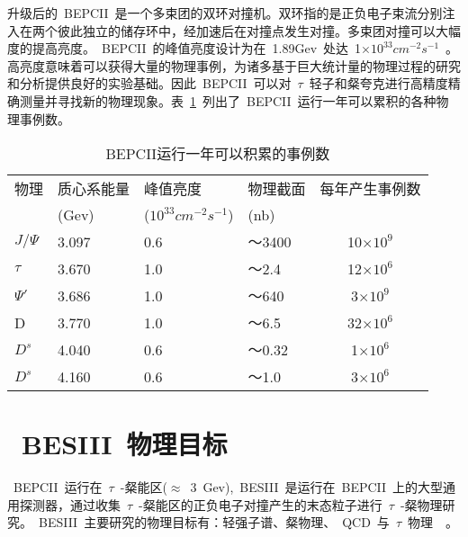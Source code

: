 升级后的~BEPCII~是一个多束团的双环对撞机。双环指的是正负电子束流分别注入在两个彼此独立的储存环中，经加速后在对撞点发生对撞。多束团对撞可以大幅度的提高亮度。~BEPCII~的峰值亮度设计为在~1.89Gev~处达~1$\times$$10^{33}$$cm^{-2}$$s^{-1}$~。高亮度意味着可以获得大量的物理事例，为诸多基于巨大统计量的物理过程的研究和分析提供良好的实验基础。因此~BEPCII~可以对~$\tau$~轻子和粲夸克进行高精度精确测量并寻找新的物理现象。表~\ref{tbl:event-Number}~列出了~BEPCII~运行一年可以累积的各种物理事例数。
\begin{table}[h]
    \centering
    \caption{\label{tbl:event-Number} BEPCII运行一年可以积累的事例数}
    \footnotesize
    \begin{tabular}{llllc}
        \hline
        物理& 质心系能量& 峰值亮度& 物理截面& 每年产生事例数 \\
             &(Gev)      &($10^{33} $$cm^{-2}$$s^{-1}$)& (nb)\\
        \hline
        $J/\Psi$& 3.097& 0.6& ～3400&  10$\times$$10^{9}$ \\
        $\tau$&   3.670& 1.0& ～2.4&    12$\times$$10^{6}$ \\
        $\Psi'$&  3.686& 1.0& ～640&    3$\times$$10^{9}$\\
        D&        3.770& 1.0& ～6.5&    32$\times$$10^{6}$\\
        $D^{s}$&   4.040& 0.6& ～0.32&   1$\times$$10^{6}$\\
        $D^{s}$&   4.160& 0.6& ～1.0&    3$\times$$10^{6}$\\
        \hline
    \end{tabular}
\end{table}

\section{~BESIII~物理目标}
~BEPCII~运行在~$\tau$~-粲能区($\approx$~3~Gev),~BESIII~是运行在~BEPCII~上的大型通用探测器，通过收集~$\tau$~-粲能区的正负电子对撞产生的末态粒子进行~$\tau$~-粲物理研究。~BESIII~主要研究的物理目标有：轻强子谱、粲物理、~QCD~与~$\tau$~物理~\cite{wangyf2011}~\cite{chaokt:2009}。

